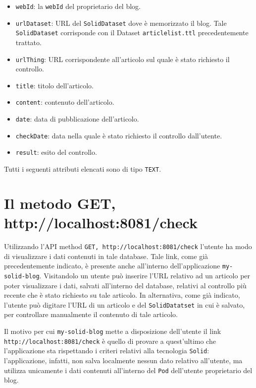 \begin{itemize}
	\item {\tt webId}: la {\tt webId} del proprietario del blog.
	\item {\tt urlDataset}: URL del {\tt SolidDataset} dove è memorizzato il blog. Tale {\tt SolidDataset} corrisponde con il Dataset {\tt articlelist.ttl} precedentemente trattato.
	\item {\tt urlThing}: URL corrispondente all'articolo sul quale è stato richiesto il controllo.
	\item {\tt title}: titolo dell'articolo.
	\item {\tt content}: contenuto dell'articolo.
	\item {\tt date}: data di pubblicazione dell'articolo.
	\item {\tt checkDate}: data nella quale è stato richiesto il controllo dall'utente.
	\item {\tt result}: esito del controllo.
\end{itemize}

Tutti i seguenti attributi elencati sono di tipo {\tt TEXT}.

\bigskip 

\section{Il metodo GET, http://localhost:8081/check}

\medskip

Utilizzando l'API method {\tt GET, http://localhost:8081/check} l'utente ha modo di visualizzare i dati contenuti in tale database. Tale link, come già precedentemente indicato, è presente anche all'interno dell'applicazione {\tt my-solid-blog}. Visitandolo un utente può inserire l'URL relativo ad un articolo per poter visualizzare i dati, salvati all'interno del database, relativi al controllo più recente che è stato richiesto su tale articolo. In alternativa, come già indicato, l'utente può digitare l'URL di un articolo e del {\tt SolidDatatset} in cui è salvato, per controllare manualmente il contenuto di tale articolo.

\bigskip

Il motivo per cui {\tt my-solid-blog} mette a disposizione dell'utente il link\\{\tt http://localhost:8081/check} è quello di provare a quest'ultimo che l'applicazione sta rispettando i criteri relativi alla tecnologia {\tt Solid}: l'applicazione, infatti, non salva localmente nessun dato relativo all'utente, ma utilizza unicamente i dati contenuti all'interno del {\tt Pod} dell'utente proprietario del blog.

